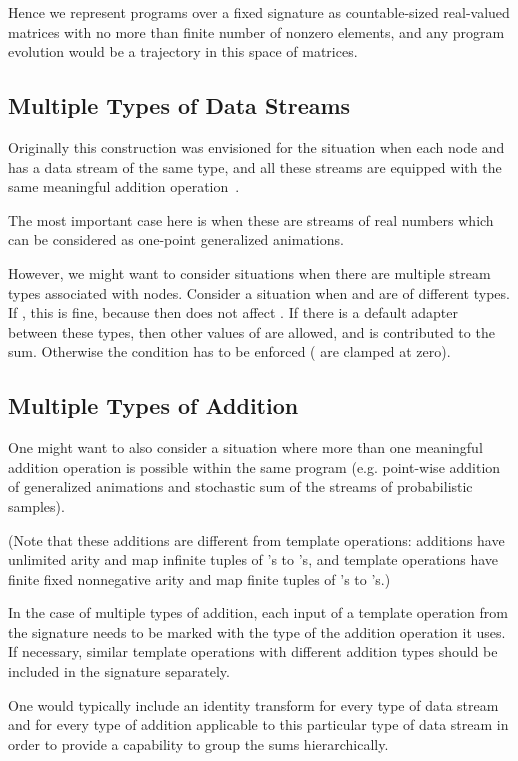 \documentclass[withtimes]{easychair}
\begin{document}
Hence we represent programs over a fixed signature as countable-sized real-valued matrices with
no more than finite number of nonzero elements, and any program evolution would be
a trajectory in this space of matrices.

\subsection{Multiple Types of Data Streams}

Originally this construction was envisioned
for the situation when each node  and  has a data stream of the same type,
and all these streams are equipped with the same meaningful addition operation~\cite{MBukatinMatthews}.

The most important case here is when these are streams of real numbers which can be considered as
one-point generalized animations.

However, we might want to consider situations when there are multiple stream types associated with nodes.
Consider a situation when  and  are of different types. If , this is fine, because then
 does not affect . If there is a default adapter  between these types, then other values of 
are allowed, and  is contributed to the sum. Otherwise the condition
 has to be enforced ( are clamped at zero).


\subsection{Multiple Types of Addition}

One might want to also consider a situation where more than one meaningful
addition operation is possible within the same program (e.g. point-wise addition of generalized animations
and stochastic sum of the streams of probabilistic samples).

(Note that these additions are different from template operations: additions have unlimited arity and map infinite
tuples of 's to 's, and template operations have finite fixed nonnegative arity and map 
finite tuples of 's to 's.)

In the case of multiple types of addition, each input  of a template operation from the signature needs to be marked with the type of
the addition operation it uses. If necessary, similar template operations with different addition types should
be included in the signature separately.

One would typically include an identity transform for every type of data stream and for every type of addition
applicable to this particular type of data stream in order to provide a capability to group the sums
hierarchically.
\end{document}
